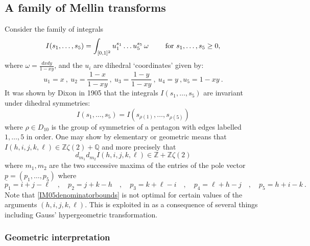 \documentclass[a4paper,10pt]{amsart}
\theoremstyle{definition}
\theoremstyle{remark}
\numberwithin{equation}{section}
\newcommand{\Z}{\mathbb Z}
\newcommand{\Q}{\mathbb Q}
\newcommand{\0}{\color{blue}{\mathsf{0}}}
\begin{document}
  \subsection{A family of Mellin transforms}
  Consider the family of integrals
  \begin{equation} \label{generalM05integrals}  I(s_1,\ldots, s_5) = \int_{[0,1]^2}  u^{s_1}_1 \ldots u^{s_5}_5 \,  \omega  \qquad \hbox{ for } s_1,\ldots, s_5 \geq 0, 
  \end{equation} 
  where    $\omega = \frac{dx dy}{1-xy}$, and the $u_i$ are   dihedral `coordinates' \cite{BrENS} given by: 
  \begin{equation}\label{uiasxy}  u_1 = x \  , \ u_2 = \frac{1-x}{1-xy} \ , \ u_3 = \frac{1-y}{1-xy} \ , \ u_4 = y \ , u_5 = 1- xy \ .  \end{equation}
     It was shown by Dixon in 1905  that the 
   integrals $I(s_1,\ldots, s_5)$ are invariant under dihedral symmetries:
      \[ I(s_1,\ldots, s_5) = I(s_{\rho(1)}, \ldots, s_{\rho(5)} )\]
      where $\rho \in D_{10}$ is  the  group of symmetries of a pentagon with edges labelled $1,\ldots, 5$ in order.
  One may show by elementary or geometric means that 
  $I(h ,i,j,k,\ell ) \in \Z \zeta(2) + \Q$
    and more precisely   \cite{RVzeta2}  that 
    \begin{equation} \label{IM05denominatorbounds}   d_{m_1} d_{m_2} I(h,i,j,k,\ell) \in \Z + \Z \zeta(2) \end{equation}
    where $m_1, m_2$ are the two successive maxima of  the entries of the pole vector $\underline{p}=(p_1,\ldots, p_5)$ where 
       \begin{equation}  \label{p1-5vectors}   p_1  = i+j  -\ell   \quad  , \quad  p_2 = j+k -h  \quad  , \quad   p_3 = k+\ell - i   \quad  , \quad   
      p_4 = \ell +h -j \quad  , \quad p_5 = h+i -k \ .  
   \end{equation}
  Note that \eqref{IM05denominatorbounds} is not optimal for certain values of the arguments $(h,i,j,k,\ell)$. This is exploited in \cite{RVzeta2} as a consequence of several things including Gauss' hypergeometric transformation.      \subsubsection{Geometric interpretation}
\end{document}
